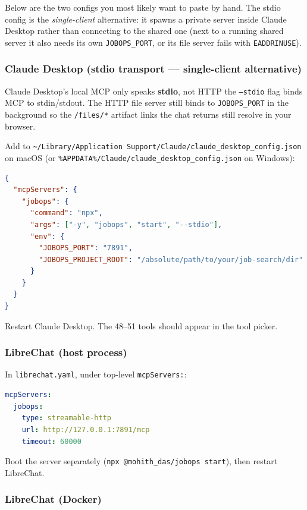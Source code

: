 \documentclass[11pt,letterpaper]{article}
\newcommand{\flag}[1]{\texttt{#1}}
\newcommand{\fpath}[1]{\texttt{#1}}
\newcommand{\env}[1]{\texttt{#1}}
\newcommand{\cmd}[1]{\texttt{#1}}
\begin{document}
Below are the two configs you most likely want to paste by hand. The stdio config is the \emph{single-client} alternative: it spawns a private server inside Claude Desktop rather than connecting to the shared one (next to a running shared server it also needs its own \env{JOBOPS\_PORT}, or its file server fails with \texttt{EADDRINUSE}).

\subsubsection*{Claude Desktop (stdio transport — single-client alternative)}

Claude Desktop's local MCP only speaks \textbf{stdio}, not HTTP \textemdash{} the
\flag{--stdio} flag binds MCP to stdin/stdout. The HTTP file server still binds to
\env{JOBOPS\_PORT} in the background so the \texttt{/files/*} artifact links the
chat returns still resolve in your browser.

Add to \fpath{\textasciitilde/Library/Application Support/Claude/claude\_desktop\_config.json} on macOS (or \fpath{\%APPDATA\%/Claude/claude\_desktop\_config.json} on Windows):

\begin{lstlisting}[language=json]
{
  "mcpServers": {
    "jobops": {
      "command": "npx",
      "args": ["-y", "jobops", "start", "--stdio"],
      "env": {
        "JOBOPS_PORT": "7891",
        "JOBOPS_PROJECT_ROOT": "/absolute/path/to/your/job-search/dir"
      }
    }
  }
}
\end{lstlisting}

Restart Claude Desktop. The 48--51 tools should appear in the tool picker.

\subsubsection*{LibreChat (host process)}

In \fpath{librechat.yaml}, under top-level \texttt{mcpServers:}:

\begin{lstlisting}[language=yaml]
mcpServers:
  jobops:
    type: streamable-http
    url: http://127.0.0.1:7891/mcp
    timeout: 60000
\end{lstlisting}

Boot the server separately (\cmd{npx @mohith\_das/jobops start}), then restart LibreChat.

\subsubsection*{LibreChat (Docker)}
\end{document}
